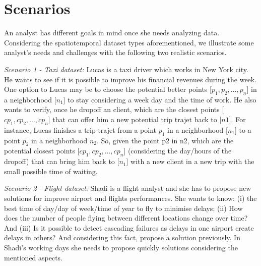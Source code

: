 \documentclass{sig-alternate-05-2015}
\begin{document}








\section{Scenarios}\label{sec:scenarios}

An analyst has different goals in mind once she needs analyzing data.
Considering the spatiotemporal dataset types aforementioned, we illustrate some
analyst's needs and challenges with the following two realistic scenarios.   
\bigskip

\textit{Scenario 1 - Taxi dataset:} Lucas is a taxi driver which works in New
York city. He wants to see if it is possible to improve his financial revenues
during the week. One option to Lucas may be to choose the potential better
points [$p_1, p_2, \ldots, p_n $] in a neighborhood [$n_1$] to stay considering
a week day and the time of work. He also wants to verify, once he dropoff an
client, which are the closest points [$cp_1, cp_2, \ldots, cp_n $] that can
offer him a new potential trip trajet back to [$n1$]. For instance, Lucas
finishes a trip trajet from a point $p_1$ in a neighborhood [$n_1$] to a point
$p_2$ in a neighborhood $n_2$.  So, given the point p2 in n2, which are the
potential closest points [$cp_1, cp_2, \ldots, cp_n $] (considering the
day/hours of the dropoff) that can bring him back to [$n_1$] with a new client
in a new trip with the small possible time of waiting.
\bigskip

\textit{Scenario 2 - Flight dataset}: Shadi is a flight analyst and she has to
propose new solutions for improve airport and flights performances. She wants to know:
(i) the best time of day/day of week/time of year to fly to minimise delays;
(ii) How does the number of people flying between different locations change
over time? And (iii) Is it possible to detect cascading failures as delays in
one airport create delays in others? And considering this fact, propose a
solution previously. In Shadi's working days she needs to propose quickly
solutions considering the mentioned aspects. 

% 
% 
\end{document}
